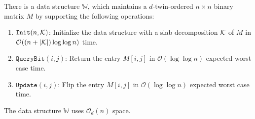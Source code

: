 \documentclass[runningheads]{llncs}
\newcommand{\Oh}{\mathcal{O}}
\begin{document}
\begin{theorem}\label{thm:wc}
There is a data structure $\mathbb{W}$, which maintains a
$d$-twin-ordered $n\times n$ binary matrix $M$
by supporting the following operations:
\begin{enumerate}
 \item $\mathtt{Init}(n, \cal K)$: Initialize the data structure
with a slab decomposition $\cal K$ of $M$ in
$\Oh((n + |{\cal K}|) \log \log n)$ time.
 \item $\mathtt{QueryBit}(i,j)$: Return the entry $M[i, j]$ in
 $\Oh(\log \log n)$ expected worst case time.
 \item $\mathtt{Update}(i, j)$: Flip the entry $M[i, j]$ in
 $\Oh(\log \log n)$ expected worst case time.
\end{enumerate}
The data structure $\mathbb{W}$ uses $\Oh_d(n)$ space.
\end{theorem}
\end{document}
